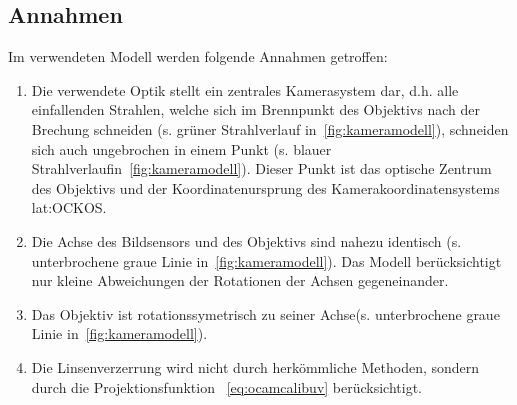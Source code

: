 \subsection{Annahmen}
Im verwendeten Modell werden folgende Annahmen getroffen:
\begin{enumerate}
\item Die verwendete Optik stellt ein zentrales Kamerasystem dar, d.h. alle einfallenden Strahlen, welche sich im Brennpunkt des Objektivs nach der Brechung schneiden (s. grüner Strahlverlauf in~\ref{fig:kameramodell}), schneiden sich auch ungebrochen in einem Punkt (s. blauer Strahlverlaufin~\ref{fig:kameramodell}). Dieser Punkt ist das optische Zentrum des Objektivs und der Koordinatenursprung des Kamerakoordinatensystems \gls{lat:OCKOS}.
\item \label{item:ocamcalibassm2} Die Achse des Bildsensors und des Objektivs sind nahezu identisch (s. unterbrochene graue Linie in~\ref{fig:kameramodell}). Das Modell berücksichtigt nur kleine Abweichungen der Rotationen der Achsen gegeneinander.
\item Das Objektiv ist rotationssymetrisch zu seiner Achse(s. unterbrochene graue Linie in~\ref{fig:kameramodell}).
\item Die Linsenverzerrung wird nicht durch herkömmliche Methoden, sondern durch die Projektionsfunktion ~\eqref{eq:ocamcalibuv} berücksichtigt.
\end{enumerate}

